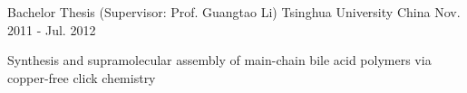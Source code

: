 \begin{cventries}
\cventry
{Bachelor Thesis (Supervisor: Prof.  Guangtao Li)} %
{Tsinghua University} %
{China} %
{Nov. 2011 - Jul. 2012} %
{
  \begin{cvitems}
  \item Synthesis and supramolecular assembly of main-chain bile acid polymers via copper-free click chemistry
  \end{cvitems}
}
\end{cventries}
